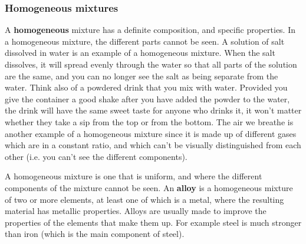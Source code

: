             \subsubsection{ Homogeneous mixtures}
            \nopagebreak
        \label{m38708*id62762}A \textbf{homogeneous} mixture has a definite composition, and specific properties. In a homogeneous mixture, the different parts cannot be seen. A solution of salt dissolved in water is an example of a homogeneous mixture. When the salt dissolves, it will spread evenly through the water so that all parts of the solution are the same, and you can no longer see the salt as being separate from the water. Think also of a powdered drink that you mix with water. Provided you give the container a good shake after you have added the powder to the water, the drink will have the same sweet taste for anyone who drinks it, it won't matter whether they take a sip from the top or from the bottom. The air we breathe is another example of a homogeneous mixture since it is made up of different gases which are in a constant ratio, and which can't be visually distinguished from each other (i.e. you can't see the different components).\par 
\label{m38708*fhsst!!!underscore!!!id96} { \label{m38708*meaningfhsst!!!underscore!!!id96}
        A homogeneous mixture is one that is uniform, and where the different components of the mixture cannot be seen. 
         } 
        \label{m38708*id62795}An \textbf{alloy} is a homogeneous mixture of two or more elements, at least one of which is a metal, where the resulting material has metallic properties. Alloys are usually made to improve the properties of the elements that make them up. For example steel is much stronger than iron (which is the main component of steel).\par 
\label{m38708*eip-479}
